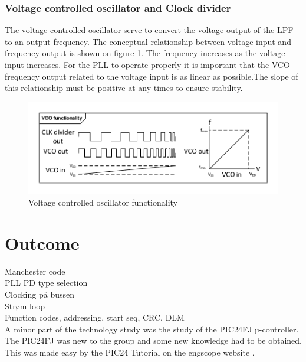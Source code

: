\subsubsection{Voltage controlled oscillator and Clock divider}
The voltage controlled oscillator serve to convert the voltage output of the LPF to an output frequency. The conceptual relationship between voltage input and frequency output is shown on figure \ref{fig:VCO_func}. The frequency increases as the voltage input increases. For the PLL to operate properly it is important that the VCO frequency output related to the voltage input is as linear as possible.The slope of this relationship must be positive at any times to ensure stability.
\begin{figure}[H]
	\centering
	\includegraphics[width=1\textwidth]{billeder/10technologystudies/VCO_functionality}
	\caption{Voltage controlled oscillator functionality}
	\label{fig:VCO_func}
\end{figure}

\section{Outcome}


Manchester code\\

PLL PD type selection\\

Clocking på bussen\\

Strøm loop\\

Function codes, addressing, start seq, CRC, DLM\\

A minor part of the technology study was the study of the PIC24FJ µ-controller. The PIC24FJ was new to the group and some new knowledge had to be obtained. This was made easy by the PIC24 Tutorial on the engscope website \citep{Engscope}.
